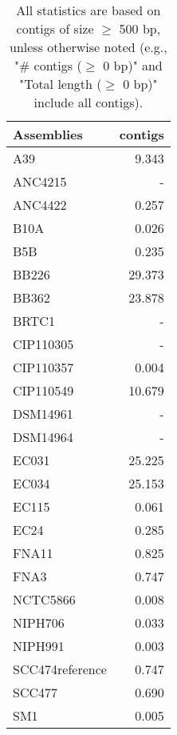\documentclass[12pt,a4paper]{article}
\begin{document}
\begin{table}[ht]
\begin{center}
\caption{All statistics are based on contigs of size $\geq$ 500 bp, unless otherwise noted (e.g., "\# contigs ($\geq$ 0 bp)" and "Total length ($\geq$ 0 bp)" include all contigs).}
\begin{tabular}{|l*{1}{|r}|}
\hline
Assemblies & contigs \\ \hline
A39 & 9.343 \\ \hline
ANC4215 & - \\ \hline
ANC4422 & 0.257 \\ \hline
B10A & 0.026 \\ \hline
B5B & 0.235 \\ \hline
BB226 & 29.373 \\ \hline
BB362 & 23.878 \\ \hline
BRTC1 & - \\ \hline
CIP110305 & - \\ \hline
CIP110357 & 0.004 \\ \hline
CIP110549 & 10.679 \\ \hline
DSM14961 & - \\ \hline
DSM14964 & - \\ \hline
EC031 & 25.225 \\ \hline
EC034 & 25.153 \\ \hline
EC115 & 0.061 \\ \hline
EC24 & 0.285 \\ \hline
FNA11 & 0.825 \\ \hline
FNA3 & 0.747 \\ \hline
NCTC5866 & 0.008 \\ \hline
NIPH706 & 0.033 \\ \hline
NIPH991 & 0.003 \\ \hline
SCC474reference & 0.747 \\ \hline
SCC477 & 0.690 \\ \hline
SM1 & 0.005 \\ \hline
\end{tabular}
\end{center}
\end{table}
\end{document}
